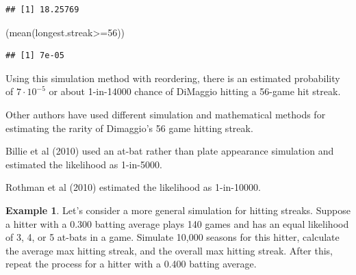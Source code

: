 \documentclass[
  11pt,
]{book}
\newenvironment{Shaded}{\begin{snugshade}}{\end{snugshade}}
\newcommand{\DecValTok}[1]{\textcolor[rgb]{0.00,0.00,0.81}{#1}}
\newcommand{\FunctionTok}[1]{\textcolor[rgb]{0.00,0.00,0.00}{#1}}
\newcommand{\NormalTok}[1]{#1}
\newcommand{\SpecialCharTok}[1]{\textcolor[rgb]{0.00,0.00,0.00}{#1}}
\theoremstyle{definition}
\theoremstyle{definition}
\newtheorem{example}{Example}[chapter]
\theoremstyle{definition}
\theoremstyle{definition}
\theoremstyle{remark}
\begin{document}
\begin{verbatim}
## [1] 18.25769
\end{verbatim}

\begin{Shaded}
\begin{Highlighting}[]
\NormalTok{(}\FunctionTok{mean}\NormalTok{(longest.streak}\SpecialCharTok{\textgreater{}=}\DecValTok{56}\NormalTok{))}
\end{Highlighting}
\end{Shaded}

\begin{verbatim}
## [1] 7e-05
\end{verbatim}

Using this simulation method with reordering, there is an estimated probability of \(7 \cdot 10^{-5}\) or about 1-in-14000 chance of DiMaggio hitting a 56-game hit streak.

Other authors have used different simulation and mathematical methods for estimating the rarity of Dimaggio's 56 game hitting streak.

Billie et al (2010) used an at-bat rather than plate appearance simulation and estimated the likelihood as 1-in-5000.

Rothman et al (2010) estimated the likelihood as 1-in-10000.

\newpage

\begin{example}
Let's consider a more general simulation for hitting streaks. Suppose a hitter with a 0.300 batting average plays 140 games and has an equal likelihood of 3, 4, or 5 at-bats in a game. Simulate 10,000 seasons for this hitter, calculate the average max hitting streak, and the overall max hitting streak. After this, repeat the process for a hitter with a 0.400 batting average.
\end{example}
\end{document}

